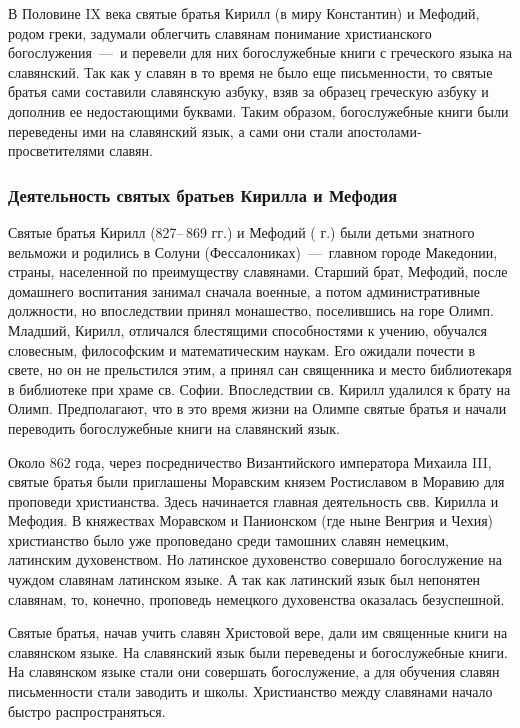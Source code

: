 \documentclass[11pt,a4paper,oneside]{memoir}
\begin{document}
    В Половине IX века святые братья Кирилл (в миру Константин) и Мефодий, родом греки, задумали облегчить славянам понимание христианского богослужения~---~и перевели для них богослужебные книги с греческого языка на славянский. Так как у славян в то время не было еще письменности, то святые братья сами составили славянскую азбуку, взяв за образец греческую азбуку и дополнив ее недостающими буквами. Таким образом, богослужебные книги были переведены ими на славянский язык, а сами они стали апостолами-просветителями славян.
    
                \subsubsection{Деятельность святых братьев Кирилла и Мефодия}

    Святые братья Кирилл (827--\,869 гг.) и Мефодий ( г.) были детьми знатного вельможи и родились в Солуни (Фессалониках)~---~главном городе Македонии, страны, населенной по преимуществу славянами. Старший брат, Мефодий, после домашнего воспитания занимал сначала военные, а потом административные должности, но впоследствии принял монашество, поселившись на горе Олимп. Младший, Кирилл, отличался блестящими способностями к учению, обучался словесным, философским и математическим наукам. Его ожидали почести в свете, но он не прельстился этим, а принял сан священника и место библиотекаря в библиотеке при храме св. Софии. Впоследствии св. Кирилл удалился к брату на Олимп. Предполагают, что в это время жизни на Олимпе святые братья и начали переводить богослужебные книги на славянский язык.

    Около 862 года, через посредничество Византийского императора Михаила III, святые братья были приглашены Моравским князем Ростиславом в Моравию для проповеди христианства. Здесь начинается главная деятельность свв. Кирилла и Мефодия. В княжествах Моравском и Панионском (где ныне Венгрия и Чехия) христианство было уже проповедано среди тамошних славян немецким, латинским духовенством. Но латинское духовенство совершало богослужение на чуждом славянам латинском языке. А так как латинский язык был непонятен славянам, то, конечно, проповедь немецкого духовенства оказалась безуспешной.

    Святые братья, начав учить славян Христовой вере, дали им священные книги на славянском языке. На славянский язык были переведены и богослужебные книги. На славянском языке стали они совершать богослужение, а для обучения славян письменности стали заводить и школы. Христианство между славянами начало быстро распространяться.
\end{document}
